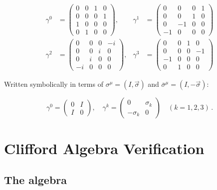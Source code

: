 \begin{align}
  \gamma^0 &= \begin{pmatrix}0 & 0 & 1 & 0 \\ 0 & 0 & 0 & 1 \\ 1 & 0 & 0 & 0 \\ 0 & 1 & 0 & 0\end{pmatrix},&
  \gamma^1 &= \begin{pmatrix}0 & 0 & 0 & 1 \\ 0 & 0 & 1 & 0 \\ 0 & -1 & 0 & 0 \\ -1 & 0 & 0 & 0\end{pmatrix}\\[6pt]
  \gamma^2 &= \begin{pmatrix}0 & 0 & 0 & -i \\ 0 & 0 & i & 0 \\ 0 & i & 0 & 0 \\ -i & 0 & 0 & 0\end{pmatrix},&
  \gamma^3 &= \begin{pmatrix}0 & 0 & 1 & 0 \\ 0 & 0 & 0 & -1 \\ -1 & 0 & 0 & 0 \\ 0 & 1 & 0 & 0\end{pmatrix}
\end{align}

\noindent Written symbolically in terms of $\sigma^\mu = (I, \vec{\sigma})$
and $\bar{\sigma}^\mu = (I,-\vec{\sigma})$:

\[
  \gamma^0 = \begin{pmatrix}0&I\\I&0\end{pmatrix},\quad
  \gamma^k = \begin{pmatrix}0&\sigma_k\\-\sigma_k&0\end{pmatrix}
  \quad (k=1,2,3)\,.
\]

\section{Clifford Algebra Verification}

\subsection{The algebra}

